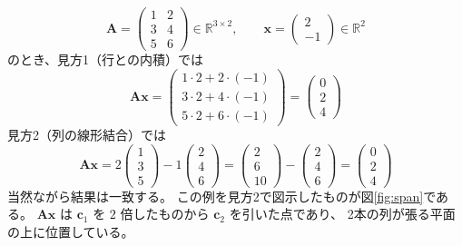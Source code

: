 \begin{equation*}
  \bm{A} = \begin{pmatrix} 1 & 2 \\ 3 & 4 \\ 5 & 6 \end{pmatrix} \in \mathbb{R}^{3 \times 2},
  \qquad \bm{x} = \begin{pmatrix} 2 \\ -1 \end{pmatrix} \in \mathbb{R}^2
\end{equation*}
のとき、見方1（行との内積）では
\begin{equation*}
  \bm{A}\bm{x} = \begin{pmatrix} 1 \cdot 2 + 2 \cdot (-1) \\ 3 \cdot 2 + 4 \cdot (-1) \\ 5 \cdot 2 + 6 \cdot (-1) \end{pmatrix}
  = \begin{pmatrix} 0 \\ 2 \\ 4 \end{pmatrix}
\end{equation*}
見方2（列の線形結合）では
\begin{equation*}
  \bm{A}\bm{x} = 2 \begin{pmatrix} 1 \\ 3 \\ 5 \end{pmatrix} - 1 \begin{pmatrix} 2 \\ 4 \\ 6 \end{pmatrix}
  = \begin{pmatrix} 2 \\ 6 \\ 10 \end{pmatrix} - \begin{pmatrix} 2 \\ 4 \\ 6 \end{pmatrix}
  = \begin{pmatrix} 0 \\ 2 \\ 4 \end{pmatrix}
\end{equation*}
当然ながら結果は一致する。
この例を見方2で図示したものが図\ref{fig:span}である。
$\bm{A}\bm{x}$ は $\bm{c}_1$ を $2$ 倍したものから $\bm{c}_2$ を引いた点であり、
2本の列が張る平面の上に位置している。


